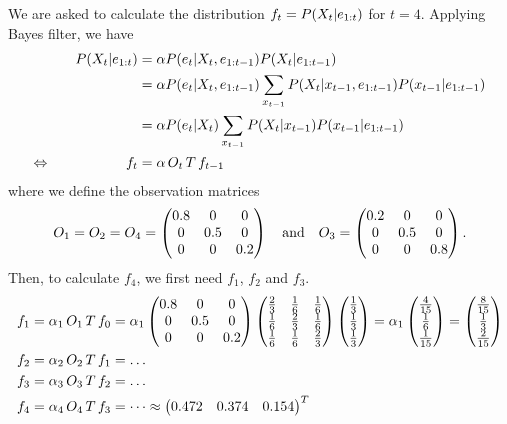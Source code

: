 \documentclass[11pt, a4paper]{article}
\begin{document}
\begin{enumerate}
    \begin{solution}
        We are asked to calculate the distribution $f_t = P(X_t \vert e_{1:t})$ for $t = 4$. Applying Bayes filter, we have
        \begin{alignat*}{2}
            && P(X_t \vert e_{1:t}) & = \alpha P(e_t \vert X_t, e_{1:t-1}) P(X_t \vert e_{1:t-1}) \\
            &&& = \alpha P(e_t \vert X_t, e_{1:t-1}) \sum_{x_{t-1}} P(X_t \vert x_{t-1}, e_{1:t-1}) P(x_{t-1} \vert e_{1:t-1}) \\
            &&& = \alpha P(e_t \vert X_t) \sum_{x_{t-1}} P(X_t \vert x_{t-1}) P(x_{t-1} \vert e_{1:t-1}) \\
            \Leftrightarrow \quad && f_t & = \alpha \, O_t \, T \, f_{t-1}
        \end{alignat*}
        where we define the observation matrices
        \begin{equation*}
                O_1 = O_2 = O_4 = \begin{pmatrix}0.8 & 0 & 0 \\ 0 & 0.5 & 0 \\ 0 & 0 & 0.2\end{pmatrix} \quad \text{and} \quad O_3 = \begin{pmatrix}0.2 & 0 & 0 \\ 0 & 0.5 & 0 \\ 0 & 0 & 0.8\end{pmatrix} .
        \end{equation*}
        Then, to calculate $f_4$, we first need $f_1$, $f_2$ and $f_3$.
        \begin{align*}
            f_1 & = \alpha_1 \, O_1 \, T \, f_0 = \alpha_1 \begin{pmatrix}0.8 & 0 & 0 \\ 0 & 0.5 & 0 \\ 0 & 0 & 0.2\end{pmatrix} \begin{pmatrix}
                \frac{2}{3} & \frac{1}{6} & \frac{1}{6} \\
                \frac{1}{6} & \frac{2}{3} & \frac{1}{6} \\
                \frac{1}{6} & \frac{1}{6} & \frac{2}{3}
            \end{pmatrix} \begin{pmatrix}\frac{1}{3} \\ \frac{1}{3} \\ \frac{1}{3}\end{pmatrix} = \alpha_1 \begin{pmatrix}\frac{4}{15} \\ \frac{1}{6} \\ \frac{1}{15}\end{pmatrix} = \begin{pmatrix}\frac{8}{15} \\ \frac{1}{3} \\ \frac{2}{15}\end{pmatrix} \\
            f_2 & = \alpha_2 \, O_2 \, T \, f_1 = \dots \\
            f_3 & = \alpha_3 \, O_3 \, T \, f_2 = \dots \\
            f_4 & = \alpha_4 \, O_4 \, T \, f_3 = \dots \approx \begin{pmatrix}0.472 & 0.374 & 0.154\end{pmatrix}^T
        \end{align*}
    \end{solution}
    

\end{enumerate}
\end{document}
